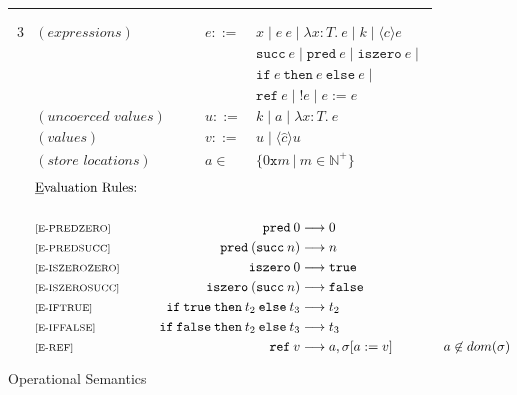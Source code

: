\begin{figure}[ht!]
    \caption{Operational Semantics}
    \hrule
    \vspace{4mm}
    \qquad {}
    \begin{alignat*}{3}
        &(\textit{expressions}) \qquad 
        & e ::= \: & x \; | \;  
          e \: e \; | \;
          \lambda x \! : \! T . \: e \; | \;
          k \; | \; \langle c \rangle e\\
    &&    & \texttt{succ} \: e \; | \;
          \texttt{pred} \: e \; | \;
          \texttt{iszero} \: e \; | \; \\
    &&    & \texttt{if} \: e \: \texttt{then} \: e \: \texttt{else} \: e \; | \; \\
    &&    & \texttt{ref} \: e \; | \;
          !e \; | \;
          e := e \\
        &(\textit{uncoerced values}) \qquad
        & u ::= \: & k \; | \; a \; | \; \lambda x \! : \! T. \:e  \\
        &(\textit{values}) \qquad
        & v ::= \: & u \; | \; \langle \hat{c} \rangle u \\
        &(\textit{store locations}) \qquad
        & a \in \: & \{0 \texttt{x} m \: | \: m \in \mathbb{N}^+\}
    \end{alignat*}
    \begin{alignat*}{3}
        \qquad & \text{\underline{E}valuation Rules:} \\ \\
        & {\scriptsize{\text{[E-PREDZERO]}}} \qquad & \texttt{pred} \: 0 & \longrightarrow 0\\ 
        & {\scriptsize{\text{[E-PREDSUCC]}}} \qquad & \texttt{pred} \: (\texttt{succ} \: n) & \longrightarrow n&\\
        & {\scriptsize{\text{[E-ISZEROZERO]}}} \qquad &\texttt{iszero} \: 0 & \longrightarrow \texttt{true} \\
        & {\scriptsize{\text{[E-ISZEROSUCC]}}} \qquad & \texttt{iszero} \: (\texttt{succ} \: n) & \longrightarrow \texttt{false} \\
        & {\scriptsize{\text{[E-IFTRUE]}}} \qquad & \texttt{if} \: \texttt{true} \: \texttt{then} \: t_2 \: \texttt{else} \: t_3 & \longrightarrow t_2 \\
        & {\scriptsize{\text{[E-IFFALSE]}}} \qquad & \texttt{if} \: \texttt{false} \: \texttt{then} \: t_2 \: \texttt{else} \: t_3 & \longrightarrow t_3 \\
        & {\scriptsize{\text{[E-REF]}}} \qquad & \texttt{ref} \: v & \longrightarrow a, \sigma[a := v] \hspace{1cm} & a \not \in dom(\sigma) \\

\end{alignat*}
\end{figure}

